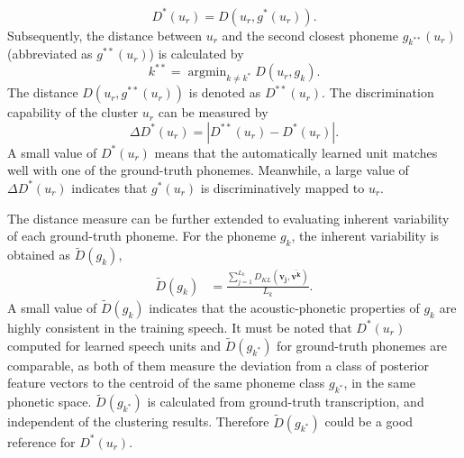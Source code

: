 \documentclass[a4paper]{article}
\begin{document}
\begin{equation}
D^* (u_r) = D(u_r, g^* (u_r)). \label{mindistance1}
\end{equation}
Subsequently, the distance between $u_r$ and the second closest phoneme $g_{k^{**}} (u_r)$ (abbreviated as $g^{**} (u_r)$) is calculated by
\begin{equation}
 k^{**} = \mathop{\arg\min}_{k \neq k^*} D(u_r, g_k). \label{suboptk}
\end{equation}
 The distance $D (u_r, g^{**} (u_r))$ is denoted as $D^{**} (u_r)$.
 The discrimination capability of the cluster $u_r$ can be measured by
\begin{equation}
\Delta D^{*} (u_r) = \left| D^{**} (u_r) - D^{*} (u_r) \right|. \label{divergencegap}
\end{equation}
 A small value of $D^* (u_r)$ means that the automatically learned unit matches well with one of the ground-truth phonemes. Meanwhile, a large value of $\Delta D^* (u_r)$ indicates that $g^* (u_r)$ is discriminatively mapped to $u_r$. 


\label{dist_un_phn}

The distance measure can be further extended to evaluating inherent variability of each ground-truth phoneme. For the phoneme $g_k$, the inherent variability is obtained as $\widetilde{D}(g_k)$,
\begin{align}
 \widetilde{D}(g_k)&= \frac{\sum\limits_{j=1}^{L_k} D_{KL} (\bm{v_{j}}, \bm{\overline{v^k}} ) }{L_k}.  \label{distanceinner}
\end{align}
A small value of $\widetilde{D}(g_k)$ indicates that the acoustic-phonetic properties of $g_k$ are highly consistent in the training speech. It must be noted that $D^* (u_r)$ computed for learned speech units and $\widetilde {D}(g_{k^*})$ for ground-truth phonemes are comparable, as both of them measure the deviation from a class of posterior feature vectors to the centroid of the same phoneme class $g_{k^*}$, in the same phonetic space. $\widetilde{D} (g_{k^*})$ is calculated from ground-truth transcription, and independent of the clustering results. Therefore $\widetilde{D} (g_{k^*})$ could be a good reference for $D^* (u_r)$.
\end{document}
